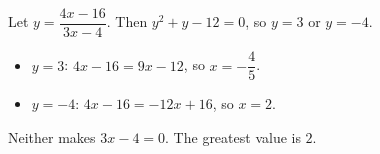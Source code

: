 Let $y=\dfrac{4x-16}{3x-4}$. Then $y^2+y-12=0$, so $y=3$ or $y=-4$.
\begin{itemize}
\item $y=3$: $4x-16=9x-12$, so $x=-\dfrac{4}{5}$.
\item $y=-4$: $4x-16=-12x+16$, so $x=2$.
\end{itemize}
Neither makes $3x-4=0$. The greatest value is $\boxed{2}$.
